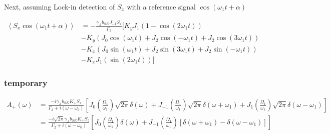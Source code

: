 \documentclass{article}
\begin{document}
Next, assuming Lock-in detection of $S_x$ with a reference signal $\cos{\left(\omega_1 t+\alpha\right)}$

\begin{align}
      \left<S_x\cos{\left(\omega_1 t+\alpha\right)}\right> &= -\frac{\gamma_{A}b_{SK}J_{-1} S_z}{\Gamma_2} \Bigg[ K_y J_{1}\left(1 - \cos{\left(2\omega_1 t\right)}\right)\\
      &-  K_y\left(J_0\cos{(\omega_1 t)}+  J_{2}\cos{(-\omega_1 t)}+J_{2}\cos{(3\omega_1 t)}\right)\\
      &-  K_x\left(J_0 \sin{(\omega_1 t)}+ J_{2} \sin{(3\omega_1 t)}+ J_{2} \sin{(-\omega_1 t)}\right)\\
      &- K_x J_{1}\left(\sin{\left(2\omega_1 t\right)}\right)\Bigg]
\end{align}

\subsubsection{temporary}

\begin{align}
     A_+\left(\omega\right)  &= \frac{-i \gamma_{A}b_{SK}K_+ S_z}{\Gamma_2 + i\left(\omega - \omega_0\right) }\left[ J_0\left(\frac{\Omega_1}{\omega_1}\right)\sqrt{2\pi}\delta \left(\omega\right)+J_{-1}\left(\frac{\Omega_1}{\omega_1}\right)\sqrt{2\pi}\delta \left(\omega + \omega_1\right)+J_1\left(\frac{\Omega_1}{\omega_1}\right)\sqrt{2\pi}\delta \left(\omega - \omega_1\right)\right]\\
     &= \frac{-i \sqrt{2\pi}\gamma_{A}b_{SK}K_+ S_z}{\Gamma_2 + i\left(\omega - \omega_0\right) }\left[ J_0\left(\frac{\Omega_1}{\omega_1}\right)\delta \left(\omega\right)+J_{-1}\left(\frac{\Omega_1}{\omega_1}\right)\left[\delta \left(\omega + \omega_1\right)-\delta \left(\omega - \omega_1\right)\right]\right]
\end{align}








\end{document}
